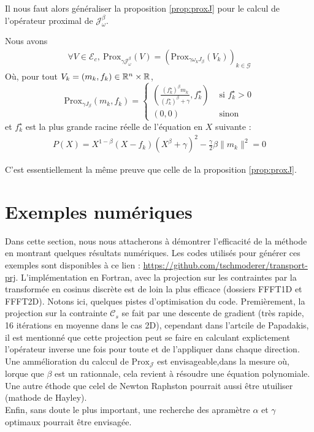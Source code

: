 \documentclass[a4paper,12pt]{article}
\newcommand{\prox}{\text{Prox}}
\begin{document}
Il nous faut alors généraliser la proposition \eqref{prop:proxJ} pour le calcul de l'opérateur proximal de $\mathcal{J}_{\omega}^{\beta}$. 
\begin{proposition}
Nous avons
\begin{align*}
\forall V\in\mathcal{E}_c,\ \prox_{\gamma \mathcal{J}_{\omega}^{\beta}}(V) = \left( \prox_{\gamma\omega_k J_{\beta}}(V_k)\right)_{k\in\mathcal{G}}
\end{align*}
Où, pour tout $V_k=(m_k,f_k)\in\mathbb{R}^n\times\mathbb{R}$, 
$$
\prox_{\gamma J_{\beta}}(m_k,f_k) =\left\{
\begin{array}{cl}
\left(\frac{(f^{\star}_k)^{\beta} m_k}{(f^{\star}_k)^{\beta}+\gamma} ,f^{\star}_k\right) & \text{ si } f^{\star}_k >0\\
(0,0) & \text{ sinon }
\end{array}\right.
$$
et $f^{\star}_k$ est la plus grande racine réelle de l'équation en $X$ suivante : 
\begin{align}
P(X) = X ^{1-\beta}(X-f_k)(X^{\beta}+\gamma)^2 -\frac{\gamma}{2}\beta\|m_k\|^2=0
\end{align}
\end{proposition}
\begin{preuve}
C'est essentiellement la même preuve que celle de la proposition \eqref{prop:proxJ}.
\end{preuve}

\section{Exemples numériques}
Dans cette section, nous nous attacherons à démontrer l'efficacité de la méthode en montrant quelques résultats numériques. 
Les codes utilisés pour générer ces exemples sont disponibles à ce lien : \url{https://github.com/tschmoderer/transport-prj}. L'implémentation en Fortran, avec la projection sur les contraintes par la transformée en cosinus discrète est de loin la plus efficace (dossiers FFFT1D et FFFT2D). Notons ici, quelques pistes d'optimisation du code. Premièrement, la projection sur la contrainte $\mathcal{C}_s$ se fait par une descente de gradient (très rapide, 16 itérations en moyenne dans le cas 2D), cependant dans l'artcile de Papadakis, il est mentionné que cette projection peut se faire en calculant explictement l'opérateur inverse une fois pour toute et de l'appliquer dans chaque direction. \\
Une ammélioration du calccul de $\prox_{\mathcal{J}}$ est envisageable,dans la mesure où, lorque que $\beta$ est un rationnale, cela revient à résoudre une équation polynomiale. Une autre éthode que celel de Newton Raphston pourrait aussi être utuiliser (mathode de Hayley). \\
Enfin, sans doute le plus important, une recherche des apramètre $\alpha$ et $\gamma$ optimaux pourrait être envisagée. 
\end{document}
